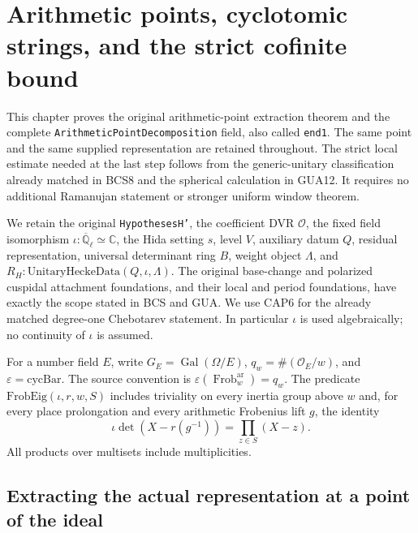 \section{Arithmetic points, cyclotomic strings, and the strict cofinite bound}
\label{sec:hida-decomposition-v45}

This chapter proves the original arithmetic-point extraction theorem and
the complete \texttt{Arithmetic\allowbreak Point\allowbreak Decomposition} field, also called
\texttt{end1}.  The same point and the same supplied representation are
retained throughout.  The strict local estimate needed at the last step
follows from the generic-unitary classification already matched in BCS8
and the spherical calculation in GUA12.  It requires no additional
Ramanujan statement or stronger uniform window theorem.

We retain the original \texttt{HypothesesH'}, the coefficient DVR
\(\mathcal O\), the fixed field isomorphism
\(\iota:\overline{\mathbb Q}_\ell\simeq\mathbb C\), the Hida setting
\(s\), level \(V\), auxiliary datum \(Q\), residual representation,
universal determinant ring \(B\), weight object \(\Lambda\), and
\(R_H:\mathrm{UnitaryHeckeData}(Q,\iota,\Lambda)\).
The original base-change and polarized cuspidal attachment foundations,
and their local and period foundations, have exactly the scope stated
in BCS and GUA.  We use CAP6 for the already matched degree-one
Chebotarev statement.  In particular \(\iota\) is used algebraically;
no continuity of \(\iota\) is assumed.

For a number field \(E\), write \(G_E=\operatorname{Gal}(\Omega/E)\),
\(q_w=\#(\mathcal O_E/w)\), and \(\varepsilon=\mathrm{cycBar}\).
The source convention is
\(\varepsilon(\operatorname{Frob}^{\mathrm{ar}}_w)=q_w\).
The predicate \(\mathrm{FrobEig}(\iota,r,w,S)\) includes triviality
on every inertia group above \(w\) and, for every place prolongation
and every arithmetic Frobenius lift \(g\), the identity
\[
 \iota\det(X-r(g^{-1}))=\prod_{z\in S}(X-z).
 \tag{HED.1}
\]
All products over multisets include multiplicities.

\subsection{Extracting the actual representation at a point of the ideal}

